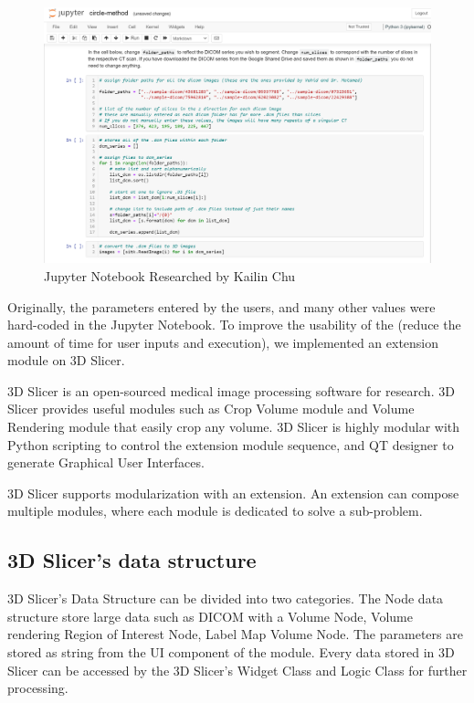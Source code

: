 \begin{figure}[H]
    \centering
    \includegraphics[width=\textwidth]{figures/AGR/jupyter_research.png}
    \caption[Jupyter Notebook Research]{Jupyter Notebook Researched by Kailin Chu}
    \label{fig_jnr}
\end{figure}

Originally, the parameters entered by the users, and many other values were hard-coded in the Jupyter Notebook. To improve the usability of the \progname{} (reduce the amount of time for user inputs and execution), we implemented an extension module on 3D Slicer. 

3D Slicer is an open-sourced medical image processing software for research. 3D Slicer provides useful modules such as Crop Volume module and Volume Rendering module that easily crop any volume. 3D Slicer is highly modular with Python scripting to control the extension module sequence, and QT designer to generate Graphical User Interfaces.

3D Slicer supports modularization with an extension. An extension can compose multiple modules, where each module is dedicated to solve a sub-problem.

\subsection{3D Slicer's data structure}

3D Slicer's Data Structure can be divided into two categories. The Node data structure store large data such as DICOM with a Volume Node, Volume rendering Region of Interest Node, Label Map Volume Node. The parameters are stored as string from the UI component of the module. Every data stored in 3D Slicer can be accessed by the 3D Slicer's Widget Class and Logic Class for further processing. 

